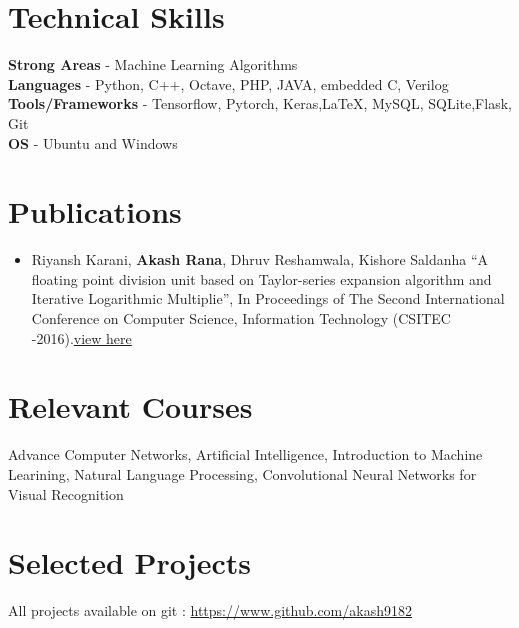 \documentclass[margin, centered]{res}
\begin{document}
\begin{resume}
\section{Technical \hspace{2mm} Skills}
\textbf{Strong Areas} - Machine Learning Algorithms\\
\textbf{Languages} - Python, C++, Octave, PHP, JAVA, embedded C, Verilog\\
\textbf{Tools/Frameworks} - Tensorflow, Pytorch, Keras,\LaTeX, MySQL, SQLite,Flask, Git\\
\textbf{OS} - Ubuntu and Windows 
\section{Publications}
\begin{itemize}[leftmargin=*]
\item Riyansh Karani, \textbf{Akash Rana}, Dhruv Reshamwala, Kishore Saldanha ``A floating point division unit based on Taylor-series expansion algorithm and Iterative Logarithmic Multiplie'', In Proceedings
of The Second International Conference on Computer Science, Information Technology (CSITEC -2016).\href{http://airccj.org/CSCP/vol6/csit65903.pdf}{view here}
\end{itemize}

\section{Relevant \hspace{2mm} Courses}
Advance Computer Networks, Artificial Intelligence, Introduction to Machine Learining, Natural Language Processing, Convolutional Neural Networks for Visual Recognition 


\section{Selected Projects}
All projects available on git : \url{https://www.github.com/akash9182}

\end{resume}
\end{document}
